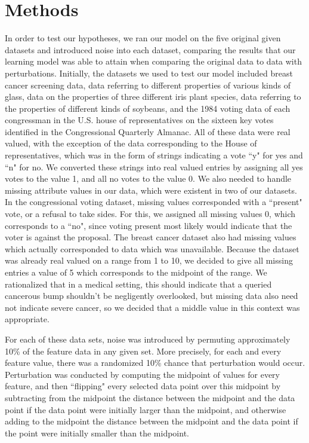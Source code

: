 \documentclass[twoside,11pt]{article}
\begin{document}
\section{Methods}
In order to test our hypotheses, we ran our model on the five original given datasets and introduced noise into each dataset,
comparing the results that our learning model was able to attain when comparing the original data to data with perturbations.
Initially, the datasets we used to test our model included breast cancer screening data, data referring to different properties of
various kinds of glass, data on the properties of three different iris plant species, data referring to the properties of different 
kinds of soybeans, and the 1984 voting data of each congressman in the U.S. house of representatives on the sixteen key 
votes identified in the Congressional Quarterly Almanac. All of these data were real valued, with the exception of the data 
corresponding to the House of representatives, which was in the form of strings indicating a vote ``y" for yes and ``n" for no.
We converted these strings into real valued entries by assigning all yes votes to the value 1, and all no votes to the value 0.
We also needed to handle missing attribute values in our data, which were existent in two of our datasets. In the congressional
 voting dataset, missing values corresponded with a ``present" vote, or a refusal to take sides. For this, we assigned all missing 
 values 0, which corresponds to a ``no", since voting present most likely would indicate that the voter is against the proposal. 
 The breast cancer dataset also had missing values which actually corresponded to data which was unavailable. Because the dataset
  was already real valued on a range from 1 to 10, we decided to give all missing entries a value of 5 which corresponds to the midpoint
  of the range. We rationalized that in a medical setting, this should indicate that a queried cancerous bump shouldn't be negligently overlooked,
  but missing data also need not indicate severe cancer, so we decided that a middle value in this context was appropriate. 


For each of these data sets, noise was introduced by permuting
approximately 10\% of the feature data in any given set. More precisely, for each and every feature value, there was a randomized 10\%
chance that perturbation would occur. Perturbation was conducted by computing the midpoint of values for every feature, and then
``flipping" every selected data point over this midpoint by subtracting from the midpoint the distance between the midpoint and the data point
if the data point were initially larger than the midpoint, and otherwise adding to the midpoint the distance between the midpoint and the data
point if the point were initially smaller than the midpoint. 
\end{document}
